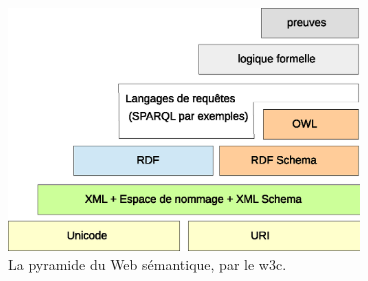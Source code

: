 \begin{figure}[h]
    \centering
    \includegraphics[width=0.831\textwidth]{figs/A/semantic-web-stack.eps}
    \caption{La pyramide du Web sémantique, par le
      \acrshort{w3c}.}\label{fig:semantic-web-stack}
\end{figure}
